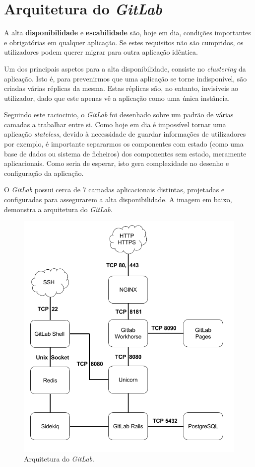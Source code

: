 \documentclass[12pt,a4paper]{article}
\begin{document}
\newpage
\section{Arquitetura do \emph{GitLab}}

A alta \textbf{disponibilidade} e \textbf{escabilidade} são, hoje em dia, condições importantes e obrigatórias em qualquer aplicação. Se estes requisitos não são cumpridos, os utilizadores podem querer migrar para outra aplicação idêntica.

Um dos principais aspetos para a alta disponibilidade, consiste no \emph{clustering} da aplicação. Isto é, para prevenirmos que uma aplicação se torne indisponível, são criadas várias réplicas da mesma. Estas réplicas são, no entanto, invisiveis ao utilizador, dado que este apenas vê a aplicação como uma única instância.

Seguindo este raciocinio, o \emph{GitLab} foi desenhado sobre um padrão de várias camadas a trabalhar entre si. Como hoje em dia é impossível tornar uma aplicação \emph{stateless}, devido à necessidade de guardar informações de utilizadores por exemplo, é importante separarmos os componentes com estado (como uma base de dados ou sistema de ficheiros) dos componentes sem estado, meramente aplicacionais. Como seria de esperar, isto gera complexidade no desenho e configuração da aplicação.

O \emph{GitLab} possui cerca de 7 camadas aplicacionais distintas, projetadas e configuradas para assegurarem a alta disponibilidade. A imagem em baixo, demonstra a arquitetura do \emph{GitLab}.

\begin{figure}[H]
  \centering
  \includegraphics[scale=0.47]{images/gitlab_architecture_diagram.png}
  \caption{Arquitetura do \emph{GitLab}.}
\end{figure}
\end{document}
